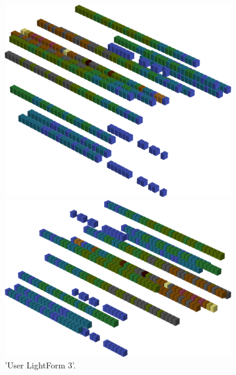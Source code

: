 \begin{minipage}[b]{0.48\linewidth}
\vspace{-1cm}
\begin{figure}[H]
    \centering
    \begin{adjustbox}{width=5cm,margin=0cm 0cm}
      \includegraphics[width=10cm]{src/colorspace_patterns/pattern11-45.png}%
    \end{adjustbox}
    \begin{adjustbox}{width=5cm,margin=0cm 0cm}
      \includegraphics[width=10cm]{src/colorspace_patterns/pattern11-225.png}%
    \end{adjustbox}
\caption{'User LightForm 3'.}
\end{figure}
\end{minipage}
